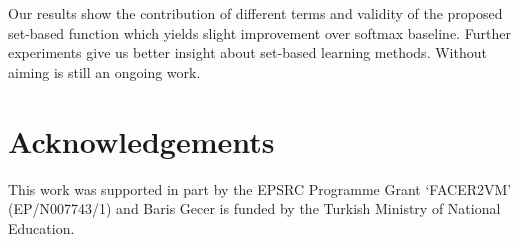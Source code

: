 \documentclass[10pt,twocolumn,letterpaper]{article}
\begin{document}
Our results show the contribution of different terms and validity of the proposed set-based function which yields slight improvement over softmax baseline. Further experiments give us better insight about set-based learning methods. Without aiming is still an ongoing work.


\section*{Acknowledgements}
This work was supported in part by the EPSRC Programme
Grant `FACER2VM' (EP/N007743/1) and Baris Gecer is funded by the Turkish Ministry of National Education.








{\small


}
\end{document}
